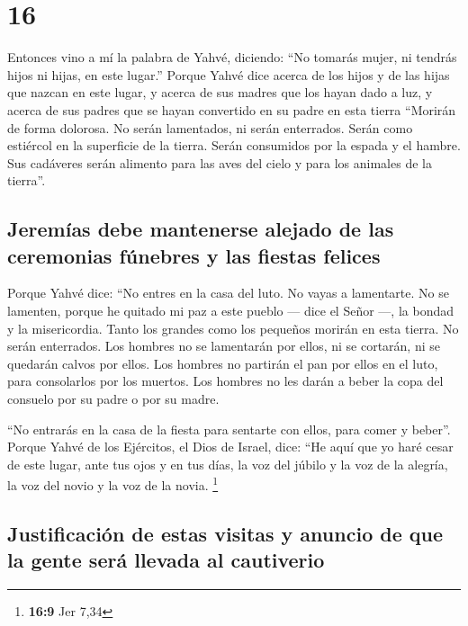 \hypertarget{section-15}{%
\section{16}\label{section-15}}

 Entonces vino a mí la palabra de Yahvé, diciendo:
 ``No tomarás mujer, ni tendrás hijos ni hijas, en este
lugar.''  Porque Yahvé dice acerca de los hijos y de las
hijas que nazcan en este lugar, y acerca de sus madres que los hayan
dado a luz, y acerca de sus padres que se hayan convertido en su padre
en esta tierra  ``Morirán de forma dolorosa. No serán
lamentados, ni serán enterrados. Serán como estiércol en la superficie
de la tierra. Serán consumidos por la espada y el hambre. Sus cadáveres
serán alimento para las aves del cielo y para los animales de la
tierra''.

\hypertarget{jeremuxedas-debe-mantenerse-alejado-de-las-ceremonias-fuxfanebres-y-las-fiestas-felices}{%
\subsection{Jeremías debe mantenerse alejado de las ceremonias fúnebres
y las fiestas
felices}\label{jeremuxedas-debe-mantenerse-alejado-de-las-ceremonias-fuxfanebres-y-las-fiestas-felices}}

 Porque Yahvé dice: ``No entres en la casa del luto. No
vayas a lamentarte. No se lamenten, porque he quitado mi paz a este
pueblo --- dice el Señor ---, la bondad y la misericordia.
 Tanto los grandes como los pequeños morirán en esta
tierra. No serán enterrados. Los hombres no se lamentarán por ellos, ni
se cortarán, ni se quedarán calvos por ellos.  Los hombres
no partirán el pan por ellos en el luto, para consolarlos por los
muertos. Los hombres no les darán a beber la copa del consuelo por su
padre o por su madre.

 ``No entrarás en la casa de la fiesta para sentarte con
ellos, para comer y beber''.  Porque Yahvé de los
Ejércitos, el Dios de Israel, dice: ``He aquí que yo haré cesar de este
lugar, ante tus ojos y en tus días, la voz del júbilo y la voz de la
alegría, la voz del novio y la voz de la novia. \footnote{\textbf{16:9}
  Jer 7,34}

\hypertarget{justificaciuxf3n-de-estas-visitas-y-anuncio-de-que-la-gente-seruxe1-llevada-al-cautiverio}{%
\subsection{Justificación de estas visitas y anuncio de que la gente
será llevada al
cautiverio}\label{justificaciuxf3n-de-estas-visitas-y-anuncio-de-que-la-gente-seruxe1-llevada-al-cautiverio}}

